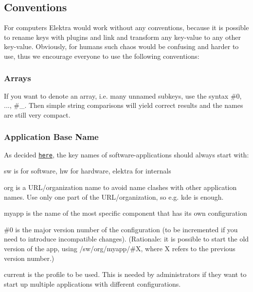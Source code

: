 \subsection*{Conventions}

For computers Elektra would work without any conventions, because it is possible to rename keys with plugins and link and transform any key-\/value to any other key-\/value. Obviously, for humans such chaos would be confusing and harder to use, thus we encourage everyone to use the following conventions\+:

\subsubsection*{Arrays}

If you want to denote an array, i.\+e. many unnamed subkeys, use the syntax {\ttfamily \#0}, ..., {\ttfamily \#\+\_}. Then simple string comparisons will yield correct results and the names are still very compact.

\subsubsection*{Application Base Name}

As decided \href{https://github.com/ElektraInitiative/libelektra/issues/302}{\tt here}, the key names of software-\/applications should always start with\+:





\begin{DoxyItemize}
\item {\ttfamily sw} is for software, {\ttfamily hw} for hardware, {\ttfamily elektra} for internals
\item {\ttfamily org} is a U\+R\+L/organization name to avoid name clashes with other application names. Use only one part of the U\+R\+L/organization, so e.\+g. {\ttfamily kde} is enough.
\item {\ttfamily myapp} is the name of the most specific component that has its own configuration
\item {\ttfamily \#0} is the major version number of the configuration (to be incremented if you need to introduce incompatible changes). (Rationale\+: it is possible to start the old version of the app, using {\ttfamily /sw/org/myapp/\#X}, where {\ttfamily X} refers to the previous version number.)
\item {\ttfamily current} is the profile to be used. This is needed by administrators if they want to start up multiple applications with different configurations.
\end{DoxyItemize}

